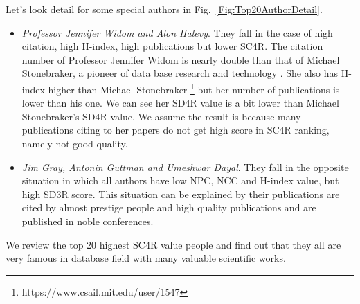 \documentclass[10pt,leqno,twoside]{article}
\begin{document}
Let's look detail for some special authors in Fig.~\ref{Fig:Top20AuthorDetail}. 
\begin{itemize}
\item \textit{Professor Jennifer Widom and Alon Halevy}. They fall in the case of high citation, high H-index, high publications but lower SC4R. 
The citation number of Professor Jennifer Widom%
is nearly double than that of Michael Stonebraker, a pioneer of data base research and technology %
. She also has H-index higher than Michael Stonebraker \footnote{https://www.csail.mit.edu/user/1547} but her number of publications is lower than his one. We can see her SD4R value is a bit lower than Michael Stonebraker's SD4R value. We assume the result is because many publications citing to her papers do not get high score in SC4R ranking, namely not good quality.

\item \textit{Jim Gray, Antonin Guttman and Umeshwar Dayal}. They fall in the opposite situation in which all authors have low NPC, NCC and H-index value, but high SD3R score. This situation can be explained by their publications are cited by almost prestige people and high quality publications and are published in noble conferences.
\end{itemize}
We review the top 20 highest SC4R value people and find out that they all are very famous in database field with many valuable scientific works.
\end{document}
